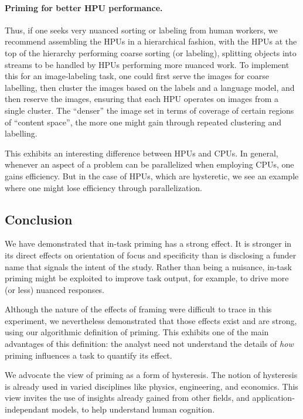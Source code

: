 \documentclass[a4paper]{report}
\begin{document}
\paragraph{Priming for better HPU performance.}
Thus, if one seeks very nuanced sorting or labeling from human workers, 
we recommend assembling the HPUs in a hierarchical fashion, with the 
HPUs at the top of the hierarchy performing coarse sorting (or labeling), 
splitting objects into streams to be handled by HPUs performing more nuanced 
work.  To implement this for an
image-labeling task, one could first serve the images for coarse labelling,
then cluster the images based on the labels and a language model, and then 
reserve the images, ensuring that each HPU operates on images from a single 
cluster.  The ``denser'' the image set in terms of coverage of certain
regions of ``content space'', the more one might gain through repeated 
clustering and labelling.

This exhibits an interesting difference between HPUs and CPUs.  In general,
whenever an aspect of a problem can be parallelized when employing CPUs, one
gains efficiency.  But in the case of HPUs, which are hysteretic, we see an 
example where one might lose efficiency through parallelization.

\subsection*{Conclusion}
We have demonstrated that in-task priming has a strong effect.  It is stronger
in its direct effects on orientation of focus and specificity than is 
disclosing a funder name that signals the intent of the study.  
Rather than being a nuisance, in-task priming might be exploited to improve
task output, for example, to drive more (or less) nuanced responses.

Although the nature of the effects of framing were difficult to trace
in this experiment, we nevertheless demonstrated that those effects exist
and are strong, using our algorithmic definition of priming.  This exhibits
one of the main advantages of this definition: the analyst need 
not understand the details of \textit{how} priming influences a task to 
quantify its effect.

We advocate the view of priming as a form of hysteresis.  The notion of 
hysteresis is already used in varied disciplines like physics, engineering,
and economics.  This view invites the use of insights already gained from 
other fields, and application-independant models, to help understand human 
cognition.
\end{document}
